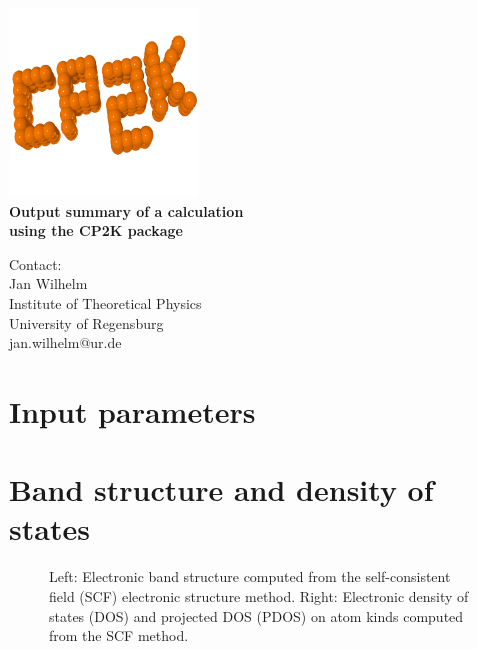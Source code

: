 \documentclass[11pt, a4paper]{scrartcl}
\newlength\figureheight
\newlength\figurewidth
\begin{document}

\begin{titlepage}
  \sffamily
  \begin{center}
{
\includegraphics[width=5cm]{cp2k_logo.png}
\\[1em]
\Huge \bfseries Output summary of a \GW calculation\\[0.4em] using the CP2K package}
  \end{center}{\large
  \vspace{3em}
  Contact:
  \\[1em]
    Jan Wilhelm
      \\[0.5em]
    Institute of Theoretical Physics
    \\[0.5em]
    University of Regensburg
    \\[0.5em]
    jan.wilhelm@ur.de
    \\[3em]
    
\tableofcontents
  }
\end{titlepage}







\pagestyle{plain}






\pagestyle{fancy}

\section{Input parameters}


\section{Band structure and density of states}
\begin{figure}[h!]
\centering
\setlength\figureheight{11cm} 
\setlength{}

\hspace{-2.5em}
\setlength{}

\caption{Left: Electronic band structure computed from the self-consistent field (SCF) electronic structure method. Right: Electronic density of states (DOS) and projected DOS (PDOS) on atom kinds computed from the SCF method.}
    \label{f2}
\end{figure}
\end{document}
